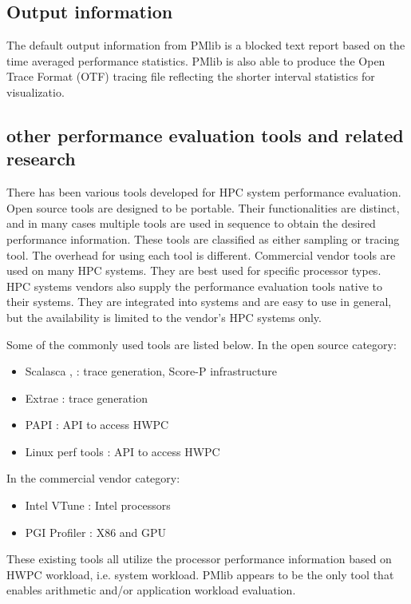 \documentclass[conference]{IEEEtran}
\begin{document}
\subsection{Output information}
\label{subsection:PMlib-output-information}
The default output information from PMlib is a blocked text report based on
the time averaged performance statistics.
PMlib is also able to produce the Open Trace Format (OTF) tracing file
reflecting the shorter interval statistics for visualizatio.
%

\subsection{other performance evaluation tools and related research}
\label{subsection:related-research}
There has been various tools developed for HPC system  performance evaluation.
Open source tools are designed to be portable.
Their functionalities are distinct, and in many cases multiple tools
are used in sequence to obtain the desired performance information.
These tools are classified as either sampling or tracing tool.
The overhead for using each tool is different.
Commercial vendor tools are used on many HPC systems.
They are best used for specific processor types.
HPC systems vendors also supply the performance evaluation tools
native to their systems.
They are integrated into systems and are easy to use in general,
but the availability is limited to the vendor's HPC systems only.

Some of the commonly used tools are listed below.
In the open source category:
\begin{itemize}
	\item Scalasca \cite{Scalasca:2017},\cite{Scalasca:2010}
			: trace generation, Score-P infrastructure
	\item Extrae \cite{Extrae:webpage} :  trace generation
	\item PAPI \cite{PAPI:5.6} : API to access HWPC
	\item Linux perf tools : API to access HWPC
\end{itemize}
In the commercial vendor category:
\begin{itemize}
		\item Intel VTune \cite{Intel:VTune} : Intel processors
		\item PGI Profiler \cite{PGI:Profiler} : X86 and GPU
\end{itemize}
These existing tools all utilize the processor performance information
based on HWPC workload, i.e. system workload.
PMlib appears to be the only tool that enables arithmetic and/or application
workload evaluation.
\end{document}
